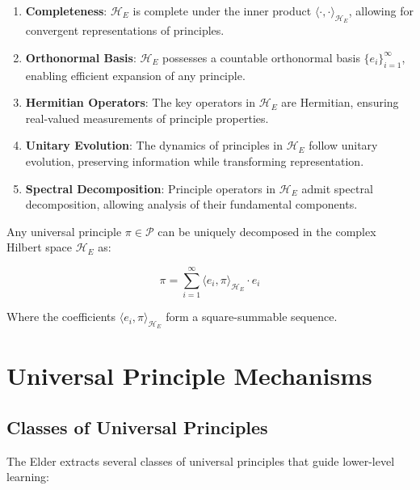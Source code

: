 \begin{enumerate}
\item \textbf{Completeness}: $\mathcal{H}_E$ is complete under the inner product $\langle \cdot, \cdot \rangle_{\mathcal{H}_E}$, allowing for convergent representations of principles.

\item \textbf{Orthonormal Basis}: $\mathcal{H}_E$ possesses a countable orthonormal basis $\{e_i\}_{i=1}^{\infty}$, enabling efficient expansion of any principle.

\item \textbf{Hermitian Operators}: The key operators in $\mathcal{H}_E$ are Hermitian, ensuring real-valued measurements of principle properties.

\item \textbf{Unitary Evolution}: The dynamics of principles in $\mathcal{H}_E$ follow unitary evolution, preserving information while transforming representation.

\item \textbf{Spectral Decomposition}: Principle operators in $\mathcal{H}_E$ admit spectral decomposition, allowing analysis of their fundamental components.
\end{enumerate}

\begin{theorem}
Any universal principle $\pi \in \mathcal{P}$ can be uniquely decomposed in the complex Hilbert space $\mathcal{H}_E$ as:

\begin{equation}
\pi = \sum_{i=1}^{\infty} \langle e_i, \pi \rangle_{\mathcal{H}_E} \cdot e_i
\end{equation}

Where the coefficients $\langle e_i, \pi \rangle_{\mathcal{H}_E}$ form a square-summable sequence.
\end{theorem}

\section{Universal Principle Mechanisms}

\subsection{Classes of Universal Principles}

The Elder extracts several classes of universal principles that guide lower-level learning:

